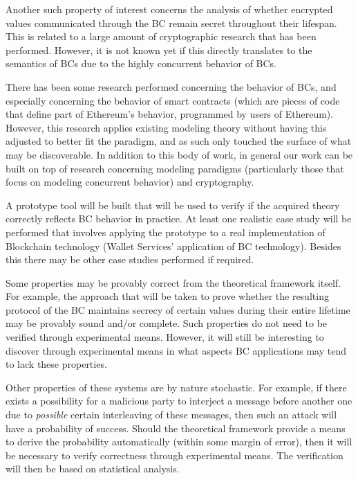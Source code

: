 \documentclass[]{article}
\begin{document}
Another such property of interest concerns the analysis of whether encrypted values communicated through the BC remain secret throughout their lifespan. This is related to a large amount of cryptographic research that has been performed. However, it is not known yet if this directly translates to the semantics of BCs due to the highly concurrent behavior of BCs.

There has been some research performed concerning the behavior of BCs, and especially concerning the behavior of smart contracts (which are pieces of code that define part of Ethereum's behavior, programmed by users of Ethereum). However, this research applies existing modeling theory without having this adjusted to better fit the paradigm, and as such only touched the surface of what may be discoverable. In addition to this body of work, in general our work can be built on top of research concerning modeling paradigms (particularly those that focus on modeling concurrent behavior) and cryptography.

A prototype tool will be built that will be used to verify if the acquired theory correctly reflects BC behavior in practice. At least one realistic case study will be performed that involves applying the prototype to a real implementation of Blockchain technology (Wallet Services' application of BC technology). Besides this there may be other case studies performed if required.

Some properties may be provably correct from the theoretical framework itself. For example, the approach that will be taken to prove whether the resulting protocol of the BC maintains secrecy of certain values during their entire lifetime may be provably sound and/or complete. Such properties do not need to be verified through experimental means. However, it will still be interesting to discover through experimental means in what aspects BC applications may tend to lack these properties.

Other properties of these systems are by nature stochastic. For example, if there exists a possibility for a malicious party to interject a message before another one due to \emph{possible} certain interleaving of these messages, then such an attack will have a probability of success. Should the theoretical framework provide a means to derive the probability automatically (within some margin of error), then it will be necessary to verify correctness through experimental means. The verification will then be based on statistical analysis.
\end{document}

